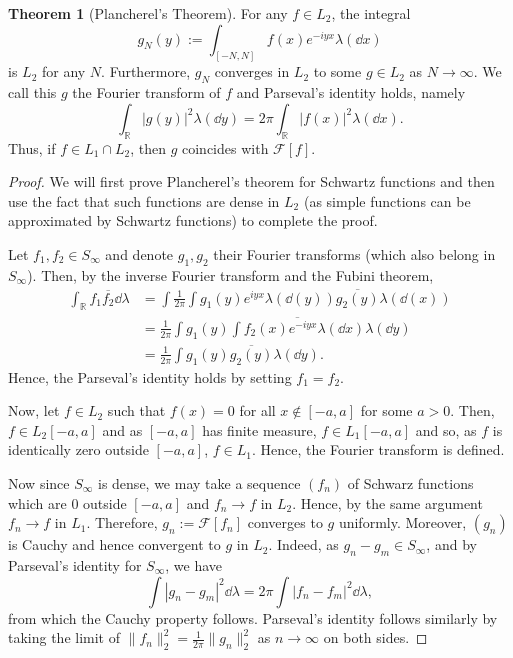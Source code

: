 \documentclass[]{article}
\theoremstyle{definition}
\newtheorem{theorem}{Theorem}
\theoremstyle{definition}
\begin{document}
\begin{theorem}[Plancherel's Theorem]
  For any \(f \in L_2\), the integral 
  \[g_N(y) := \int_{[-N, N]} f(x)e^{-iyx}\lambda(\dd x)\]
  is \(L_2\) for any \(N\). Furthermore, \(g_N\) converges in \(L_2\) to some 
  \(g \in L_2\) as \(N \to \infty\). We call this \(g\) the Fourier transform 
  of \(f\) and Parseval's identity holds, namely
  \[\int_{\mathbb{R}} |g(y)|^2 \lambda(\dd y) =
     2\pi \int_{\mathbb{R}} |f(x)|^2 \lambda(\dd x).\]
  Thus, if \(f \in L_1 \cap L_2\), then \(g\) coincides with \(\mathcal{F}[f]\).
\end{theorem}
\begin{proof}
  We will first prove Plancherel's theorem for Schwartz functions and then use 
  the fact that such functions are dense in \(L_2\) (as simple functions can be  
  approximated by Schwartz functions) to complete the proof.

  Let \(f_1, f_2 \in S_\infty\) and denote \(g_1, g_2\) their Fourier transforms 
  (which also belong in \(S_\infty\)). Then, by the inverse Fourier transform 
  and the Fubini theorem, 
  \[\begin{split}
    \int_{\mathbb{R}} f_1 \overline{f_2} \dd \lambda & = 
    \int \frac{1}{2\pi} \int g_1(y)e^{iyx} \lambda(\dd(y)) \overline{g_2(y)} 
      \lambda(\dd(x))\\
    & = \frac{1}{2\pi} \int g_1(y) \overline{\int f_2(x)e^{-iyx} 
      \lambda(\dd x)} \lambda(\dd y)\\
    & = \frac{1}{2\pi} \int g_1(y) \overline{g_2(y)} \lambda(\dd y).
  \end{split}\]
  Hence, the Parseval's identity holds by setting \(f_1 = f_2\).

  Now, let \(f \in L_2\) such that \(f(x) = 0\) for all \(x \not\in [-a, a]\) 
  for some \(a > 0\). Then, \(f \in L_2[-a, a]\) and as \([-a, a]\) has 
  finite measure, \(f \in L_1[-a, a]\) and so, as \(f\) is identically zero outside 
  \([-a, a]\), \(f \in L_1\). Hence, the Fourier transform is defined. 
  
  Now since 
  \(S_\infty\) is dense, we may take a sequence \((f_n)\) of Schwarz functions 
  which are 0 outside \([-a, a]\) and \(f_n \to f\) in \(L_2\). Hence, by the 
  same argument \(f_n \to f\) in \(L_1\). Therefore, \(g_n := \mathcal{F}[f_n]\)
  converges to \(g\) uniformly. Moreover, \((g_n)\) is Cauchy and hence convergent 
  to \(g\) in \(L_2\). Indeed, as \(g_n - g_m \in S_\infty\), and by Parseval's identity 
  for \(S_\infty\), we have 
  \[\int |g_n - g_m|^2 \dd \lambda = 2\pi \int |f_n - f_m|^2 \dd \lambda,\]
  from which the Cauchy property follows. Parseval's identity follows similarly 
  by taking the limit of \(\|f_n\|^2_2 = \frac{1}{2\pi}\|g_n\|^2_2\) as 
  \(n \to \infty\) on both sides.


\end{proof}
\end{document}
